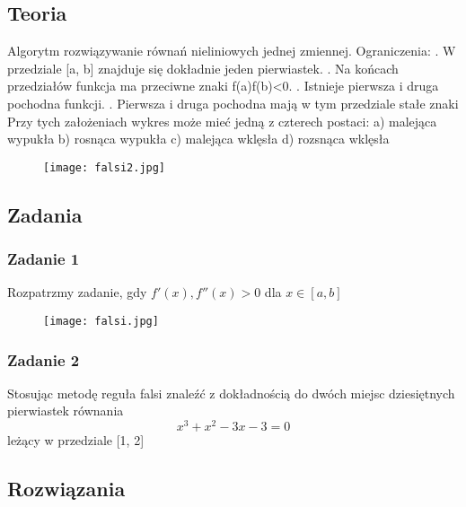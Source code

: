 \documentclass[a4paper]{article}
\begin{document}
\subsection{Teoria}
Algorytm rozwiązywanie równań nieliniowych jednej zmiennej.
\newline
Ograniczenia: . W przedziale [a, b] znajduje się dokładnie jeden pierwiastek. . Na końcach przedziałów funkcja ma przeciwne znaki f(a)f(b)<0. . Istnieje pierwsza i druga pochodna funkcji. . Pierwsza i druga pochodna mają w tym przedziale stałe znaki \newline
\newline
Przy tych założeniach wykres może mieć jedną z czterech postaci: \newline
a) malejąca wypukła \newline
b) rosnąca wypukła \newline
c) malejąca wklęsła \newline
d) rozsnąca wklęsła \newline

\begin{figure}[H]
\centering
\texttt{[image: falsi2.jpg]}
\end{figure} 

\subsection{Zadania}
\subsubsection*{Zadanie 1}
Rozpatrzmy zadanie, gdy $f'(x), f''(x) > 0$ dla $x \in [a, b]$
\begin{figure}[H]
\centering
\texttt{[image: falsi.jpg]}
\end{figure} 

\subsubsection*{Zadanie 2}
Stosując metodę reguła falsi znaleźć z dokładnością do dwóch miejsc dziesiętnych pierwiastek równania
$$ x^3+x^2-3x-3=0$$
leżący w przedziale [1, 2]
\subsection{Rozwiązania}
\end{document}
